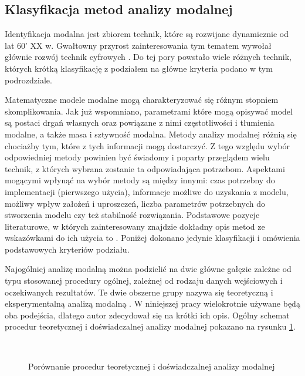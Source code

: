 \subsection{Klasyfikacja metod analizy modalnej}

Identyfikacja modalna jest zbiorem technik, które są rozwijane dynamicznie od lat 60' XX w. Gwałtowny przyrost zainteresowania tym tematem wywołał głównie rozwój technik cyfrowych \parencite{Ewins2000}. Do tej pory powstało wiele różnych technik, których krótką klasyfikację z podziałem na główne kryteria podano w tym podrozdziale.

Matematyczne modele modalne mogą charakteryzować się różnym stopniem skomplikowania. Jak już wspomniano, parametrami które mogą opisywać model są postaci drgań własnych oraz powiązane z nimi częstotliwości i tłumienia modalne, a także masa i sztywność modalna. Metody analizy modalnej różnią się chociażby tym, które z tych informacji mogą dostarczyć. Z tego względu wybór odpowiedniej metody powinien być świadomy i poparty przeglądem wielu technik, z których wybrana zostanie ta odpowiadająca potrzebom. Aspektami mogącymi wpłynąć na wybór metody są między innymi: czas potrzebny do implementacji (pierwszego użycia), informacje możliwe do uzyskania z modelu, możliwy wpływ założeń i uproszczeń, liczba parametrów potrzebnych do stworzenia modelu czy też stabilność rozwiązania. Podstawowe pozycje literaturowe, w których zainteresowany znajdzie dokładny opis metod ze wskazówkami do ich użycia to \parencite{Ewins2000,Maia1997,Zhang2004,Brincker2015,Rainieri2014}. Poniżej dokonano jedynie klasyfikacji i omówienia podstawowych kryteriów podziału.

Najogólniej analizę modalną można podzielić na dwie główne gałęzie zależne od typu stosowanej procedury ogólnej, zależnej od rodzaju danych wejściowych i oczekiwanych rezultatów. Te dwie obszerne grupy nazywa się teoretyczną i eksperymentalną analizą modalną \parencite{Lengvarsky2013}. W niniejszej pracy wielokrotnie używane będą oba podejścia, dlatego autor zdecydował się na krótki ich opis. Ogólny schemat procedur teoretycznej i doświadczalnej analizy modalnej pokazano na rysunku \ref{fig:theExpProc}.  

\begin{figure}[hbt!]
	\centering
	 \\
	\captionsetup{justification=centering}
	\caption{Porównanie procedur teoretycznej i doświadczalnej analizy modalnej}
	\label{fig:theExpProc}
\end{figure}

